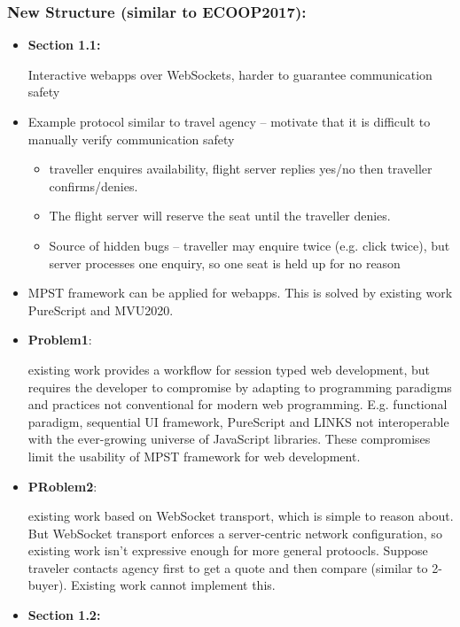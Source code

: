 \subsubsection{New Structure (similar to ECOOP2017):}
\begin{itemize}

\item \textbf{Section 1.1:}

Interactive webapps over WebSockets, harder to guarantee communication safety

\item
Example protocol similar to travel agency  -- motivate that it is difficult to manually verify communication safety

\begin{itemize}
\item traveller enquires availability, flight server replies yes/no then traveller confirms/denies.
\item The flight server will reserve the seat until the traveller denies.
\item Source of hidden bugs -- traveller may enquire twice (e.g. click twice), but server processes one enquiry, so one seat is held up for no reason
\end{itemize} 

\item MPST framework can be applied for webapps.
This is solved by existing work PureScript and MVU2020.

\item \textbf{Problem1}: 

existing work provides a workflow for session typed web development, but requires the developer to compromise by adapting to programming paradigms and practices not conventional for modern web programming. E.g. functional paradigm, sequential UI framework, PureScript and LINKS not interoperable with the ever-growing universe of JavaScript libraries. These compromises limit the usability of MPST framework
for web development.

\item \textbf{PRoblem2}: 

existing work based on WebSocket transport, which
is simple to reason about. But WebSocket transport enforces a server-centric
network configuration, so existing work isn't expressive enough for
more general protoocls. Suppose traveler contacts agency first to get a quote and then compare (similar to 2-buyer). Existing work cannot implement this.

\item \textbf{Section 1.2: }


\end{itemize}
